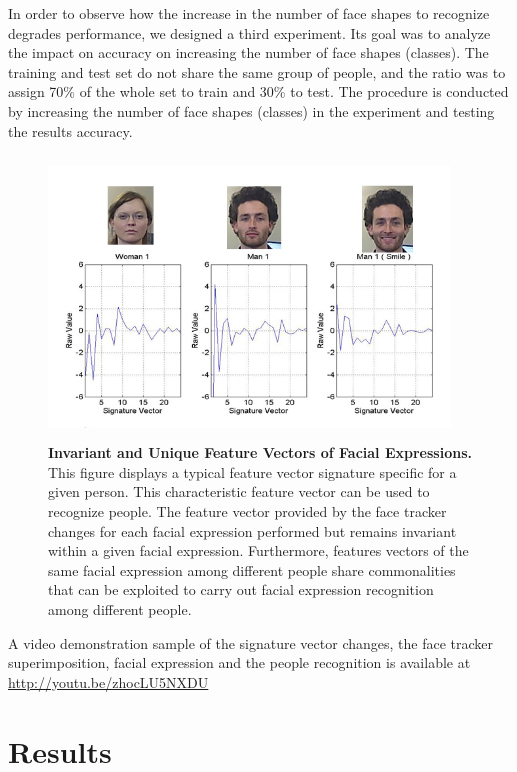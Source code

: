 \documentclass[]{article}
\begin{document}
In order to observe how the increase in the number of face shapes to recognize degrades performance, we designed a third
experiment. Its goal was to analyze the impact on accuracy on increasing the number of face shapes (classes).  The
training and test set do not share the same group of people, and the ratio was to assign 70\% of the whole set to train
and 30\% to test. The procedure is conducted by increasing the number of face shapes (classes) in the experiment and
testing the results accuracy.

\begin{figure}[ht]
\begin{center}
\vspace{-3mm}
\includegraphics[width=0.95\textwidth,height=75mm]{figures/comparationBetweenFaces2.jpg}
\end{center}
\caption{\textbf{Invariant and Unique Feature Vectors of Facial Expressions.} This figure displays a typical feature 
vector signature specific for a given person. This characteristic feature vector can be used to recognize people. The
feature vector provided by the face tracker changes for each facial expression performed but remains invariant within a
given facial expression. Furthermore, features vectors of the same facial expression among different people share commonalities that
can be exploited to carry out facial expression recognition among different people.}
\label{comparationBetweenFaces}
\end{figure}

A video demonstration sample of the signature vector changes, the face tracker
superimposition, facial expression and the people recognition is available at
\url{ http://youtu.be/zhocLU5NXDU}

\section{Results}
\end{document}
